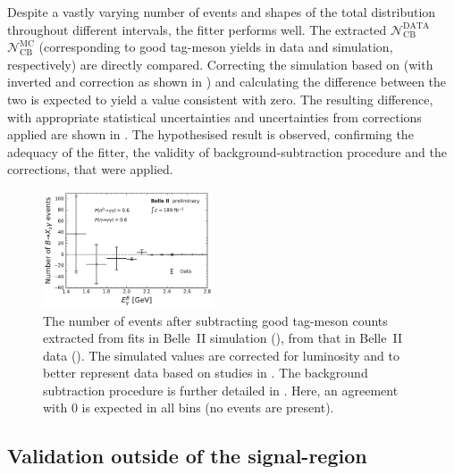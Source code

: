 Despite a vastly varying number of events and shapes of the total distribution throughout different \EB intervals,
the fitter performs well.
The extracted $\mathcal{N}_{\mathrm{CB}}^{\mathrm{DATA}}$ $\mathcal{N}_{\mathrm{CB}}^{\mathrm{MC}}$ (corresponding to good tag-\B meson yields in data and simulation, respectively)
are directly compared.
Correcting the simulation based on  (with inverted \piVeto and \etaVeto correction as shown in ) and calculating the difference between the two is expected to yield a value consistent with zero.
The resulting difference, with appropriate statistical uncertainties and uncertainties from corrections applied are shown in .
The hypothesised result is observed, confirming the adequacy of the fitter, the validity of background-subtraction procedure and the corrections, that were applied.

\begin{figure}[htbp!]
    \centering
    \includegraphics[width=0.45\textwidth]{figures/data_validation/bbar_enhanced_event_counts.pdf}
    \caption{\label{fig:bbar_enhanced_background_subtraction}
    The number of events after subtracting good tag-\B meson counts extracted from fits in Belle~II simulation (),
    from that in Belle~II data ().
    The simulated values are corrected for luminosity and to better represent data based on studies in .
    The background subtraction procedure is further detailed in .
    Here, an agreement with 0 is expected in all \EB bins (no \BtoXsgamma events are present).
    }
\end{figure}

\subsection{Validation outside of the \texorpdfstring{\EB}{EB} signal-region}\label{sec:sidebands_validation}

